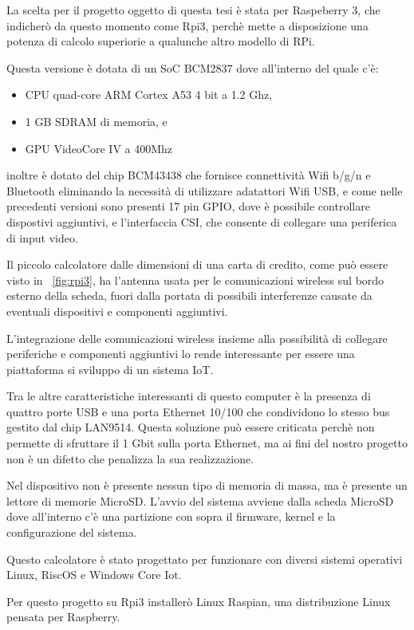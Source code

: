 La scelta per il progetto oggetto di questa tesi è stata per Raspeberry 3, che indicherò da questo momento come Rpi3, perchè mette a disposizione una potenza di calcolo superiorie a qualunche altro modello di RPi.

Questa versione è dotata di un  SoC BCM2837  dove all'interno del quale c'è:
\begin{itemize}
	\item CPU quad-core ARM Cortex A53 4 bit a 1.2 Ghz,
	\item 1 GB SDRAM di memoria, e
	\item GPU VideoCore IV a 400Mhz
\end{itemize}
inoltre  è dotato del chip BCM43438 che fornisce connettività Wifi b/g/n e Bluetooth eliminando la necessità di utilizzare  adatattori Wifi USB, e come nelle precedenti versioni sono presenti 17 pin GPIO, dove è possibile controllare dispostivi aggiuntivi, e l'interfaccia CSI, che consente di collegare una periferica di input video. 

Il piccolo calcolatore dalle dimensioni di una carta di credito, come può essere visto in \figurename~\ref{fig:rpi3}, ha l'antenna usata per le comunicazioni wireless sul bordo esterno della scheda, fuori dalla portata di possibili interferenze causate  da eventuali dispositivi e componenti aggiuntivi. 

L'integrazione delle comunicazioni wireless insieme alla possibilità di collegare periferiche e componenti aggiuntivi lo rende interessante per essere una piattaforma si sviluppo di un sistema IoT.

Tra le altre caratteristiche interessanti di questo computer è  la presenza di  quattro porte USB e una porta Ethernet 10/100 che condividono lo stesso bus gestito dal chip LAN9514. 
Questa soluzione può essere criticata  perchè non permette di sfruttare il 1 Gbit sulla porta Ethernet, ma ai fini del nostro progetto non è un difetto che penalizza la sua realizzazione.

Nel dispositivo non è presente nessun tipo di memoria di massa, ma è presente un lettore di memorie MicroSD.
L'avvio del sistema avviene dalla scheda MicroSD dove all'interno c'è una partizione con sopra il firmware, kernel e la configurazione del sistema.

Questo calcolatore è stato progettato per funzionare con diversi sistemi operativi Linux, RiscOS e Windows Core Iot.

Per questo progetto su Rpi3 installerò Linux Raspian, una distribuzione Linux pensata per Raspberry.



